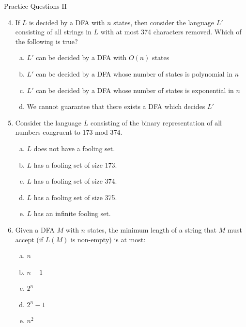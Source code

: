 \documentclass{beamer}
\begin{document}
\begin{frame}[t]{Practice Questions II}
    \begin{enumerate}
        \setcounter{enumi}{3}
        \item If $L$ is decided by a DFA with $n$ states, then consider the language $L'$ consisting of all strings in $L$ with at most 374 characters removed. Which of the following is true?
        \begin{enumerate}[(a)]
            \item $L'$ can be decided by a DFA with $O(n)$ states
            \item $L'$ can be decided by a DFA whose number of states is polynomial in $n$
            \item $L'$ can be decided by a DFA whose number of states is exponential in $n$
            \item We cannot guarantee that there exists a DFA which decides $L'$
        \end{enumerate}
        \pause\item Consider the language $L$ consisting of the binary representation of all numbers congruent to 173 mod 374.
        \begin{enumerate}[(a)]
            \item $L$ does not have a fooling set.
            \item $L$ has a fooling set of size 173.
            \item $L$ has a fooling set of size 374. %
            \item $L$ has a fooling set of size 375.
            \item $L$ has an infinite fooling set.
        \end{enumerate}
        \pause\item Given a DFA $M$ with $n$ states, the minimum length of a string that $M$ must accept (if $L(M)$ is non-empty) is at most:
            \begin{enumerate}[(a)]
                \item $n$
                \item $n-1$ %
                \item $2^n$
                \item $2^n-1$
                \item $n^2$
            \end{enumerate}
    \end{enumerate}
\end{frame}
\end{document}
